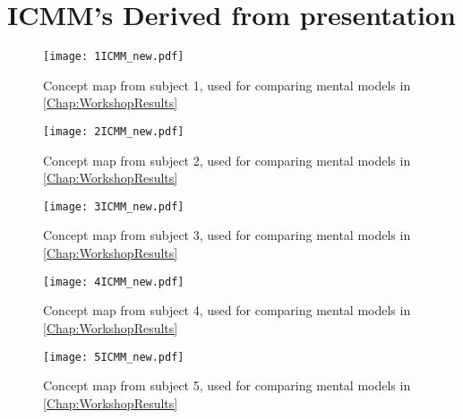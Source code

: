 \section{ICMM's Derived from presentation}
\label{PresentationICMM}
%
\begin{figure}[H]
	\centering
	\texttt{[image: 1ICMM\_new.pdf]}
	\caption{Concept map from subject 1, used for comparing mental models in \autoref{Chap:WorkshopResults}}
	\label{fig:LargeICMM1}
\end{figure}
%
\begin{figure}[H]
	\centering
	\texttt{[image: 2ICMM\_new.pdf]}
	\caption{Concept map from subject 2, used for comparing mental models in \autoref{Chap:WorkshopResults}}
	\label{fig:LargeICMM2}
\end{figure}
%
\begin{figure}[H]
	\centering
	\texttt{[image: 3ICMM\_new.pdf]}
	\caption{Concept map from subject 3, used for comparing mental models in \autoref{Chap:WorkshopResults}}
	\label{fig:LargeICMM3}
\end{figure}
%
\begin{figure}[H]
	\centering
	\texttt{[image: 4ICMM\_new.pdf]}
	\caption{Concept map from subject 4, used for comparing mental models in \autoref{Chap:WorkshopResults}}
	\label{fig:LargeICMM4}
\end{figure}
%
\begin{figure}[H]
	\centering
	\texttt{[image: 5ICMM\_new.pdf]}
	\caption{Concept map from subject 5, used for comparing mental models in \autoref{Chap:WorkshopResults}}
	\label{fig:LargeICMM5}
\end{figure}
